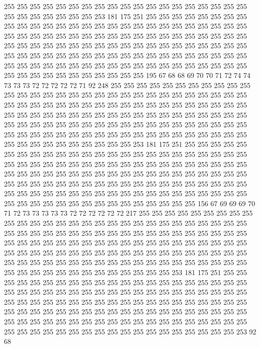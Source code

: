 255 255 255 255 255 255 255 255 255 255 255 255 255 255 255 255 255 255 255 255
255 255 255 255 255 255 253 181 175 251 255 255 255 255 255 255 255 255 255 255
255 255 255 255 255 255 255 255 255 255 255 255 255 255 255 255 255 255 255 255
255 255 255 255 255 255 255 255 255 255 255 255 255 255 255 255 255 255 255 255
255 255 255 255 255 255 255 255 255 255 255 255 255 255 255 255 255 255 255 255
255 255 255 255 255 255 255 255 255 255 255 255 255 255 255 255 255 255 255 255
255 255 255 255 255 255 255 255 255 255 255 255 255 255 255 255 255 255 255 255
255 255 255 255 195 67 68 68 69 70 70 71 72 74 74 73 73 73 72 72
72 72 72 71 92 248 255 255 255 255 255 255 255 255 255 255 255 255 255 255
255 255 255 255 255 255 255 255 255 255 255 255 255 255 255 255 255 255 255 255
255 255 255 255 255 255 255 255 255 255 255 255 255 255 255 255 255 255 255 255
255 255 255 255 255 255 255 255 255 255 255 255 255 255 255 255 255 255 255 255
255 255 255 255 255 255 255 255 255 255 255 255 255 255 255 255 255 255 255 255
255 255 255 255 255 255 255 255 255 255 255 255 255 255 255 255 255 255 255 255
255 255 253 181 175 251 255 255 255 255 255 255 255 255 255 255 255 255 255 255
255 255 255 255 255 255 255 255 255 255 255 255 255 255 255 255 255 255 255 255
255 255 255 255 255 255 255 255 255 255 255 255 255 255 255 255 255 255 255 255
255 255 255 255 255 255 255 255 255 255 255 255 255 255 255 255 255 255 255 255
255 255 255 255 255 255 255 255 255 255 255 255 255 255 255 255 255 255 255 255
255 255 255 255 255 255 255 255 255 255 255 255 255 255 255 255 255 255 255 255
255 156 67 69 69 69 70 71 72 73 73 73 73 73 72 72 72 72 72 72
217 255 255 255 255 255 255 255 255 255 255 255 255 255 255 255 255 255 255 255
255 255 255 255 255 255 255 255 255 255 255 255 255 255 255 255 255 255 255 255
255 255 255 255 255 255 255 255 255 255 255 255 255 255 255 255 255 255 255 255
255 255 255 255 255 255 255 255 255 255 255 255 255 255 255 255 255 255 255 255
255 255 255 255 255 255 255 255 255 255 255 255 255 255 255 255 255 255 255 255
255 255 255 255 255 255 255 255 255 255 255 255 255 255 255 255 255 255 253 181
175 251 255 255 255 255 255 255 255 255 255 255 255 255 255 255 255 255 255 255
255 255 255 255 255 255 255 255 255 255 255 255 255 255 255 255 255 255 255 255
255 255 255 255 255 255 255 255 255 255 255 255 255 255 255 255 255 255 255 255
255 255 255 255 255 255 255 255 255 255 255 255 255 255 255 255 255 255 255 255
255 255 255 255 255 255 255 255 255 255 255 255 255 255 255 255 255 255 255 255
255 255 255 255 255 255 255 255 255 255 255 255 255 255 255 255 255 253 92 68
